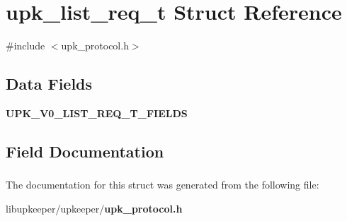\section{upk\_\-list\_\-req\_\-t Struct Reference}
\label{structupk__list__req__t}


{\ttfamily \#include $<$upk\_\-protocol.h$>$}

\subsection*{Data Fields}
\begin{DoxyCompactItemize}
\item 
{\bf UPK\_\-V0\_\-LIST\_\-REQ\_\-T\_\-FIELDS}
\end{DoxyCompactItemize}


\subsection{Field Documentation}
\subsubsection[{UPK\_\-V0\_\-LIST\_\-REQ\_\-T\_\-FIELDS}]{}\label{structupk__list__req__t_a071a52fc358a872cf9f7bed3456c348a}


The documentation for this struct was generated from the following file:\begin{DoxyCompactItemize}
\item 
libupkeeper/upkeeper/{\bf upk\_\-protocol.h}\end{DoxyCompactItemize}
